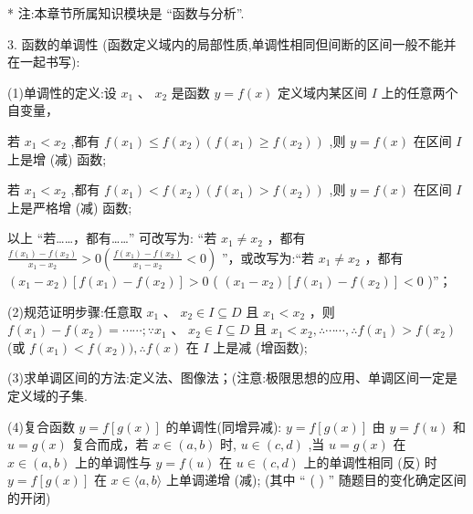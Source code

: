 * 注:本章节所属知识模块是 “函数与分析”.

\HRule

3. 函数的单调性 (函数定义域内的局部性质,单调性相同但间断的区间一般不能并在一起书写):

(1)单调性的定义:设 ${x}_{1}$ 、 ${x}_{2}$ 是函数 $y = f\left( x\right)$ 定义域内某区间 $I$ 上的任意两个自变量，

若 ${x}_{1} < {x}_{2}$ ,都有 $f\left( {x}_{1}\right)  \leq  f\left( {x}_{2}\right) \left( {f\left( {x}_{1}\right)  \geq  f\left( {x}_{2}\right) }\right)$ ,则 $y = f\left( x\right)$ 在区间 $I$ 上是增 (减) 函数;

若 ${x}_{1} < {x}_{2}$ ,都有 $f\left( {x}_{1}\right)  < f\left( {x}_{2}\right) \left( {f\left( {x}_{1}\right)  > f\left( {x}_{2}\right) }\right)$ ,则 $y = f\left( x\right)$ 在区间 $I$ 上是严格增 (减) 函数;

以上 “若……，都有……” 可改写为: “若 ${x}_{1} \neq  {x}_{2}$ ，都有 $\frac{f\left( {x}_{1}\right)  - f\left( {x}_{2}\right) }{{x}_{1} - {x}_{2}} > 0\left( {\frac{f\left( {x}_{1}\right)  - f\left( {x}_{2}\right) }{{x}_{1} - {x}_{2}} < 0}\right)$ ”，或改写为:“若 ${x}_{1} \neq  {x}_{2}$ ，都有 $\left( {{x}_{1} - {x}_{2}}\right) \left\lbrack  {f\left( {x}_{1}\right)  - f\left( {x}_{2}\right) }\right\rbrack   > 0$ ( $\left( {{x}_{1} - {x}_{2}}\right) \left\lbrack  {f\left( {x}_{1}\right)  - f\left( {x}_{2}\right) }\right\rbrack   < 0$ )”；

(2)规范证明步骤:任意取 ${x}_{1}\text{ 、 }{x}_{2} \in  I \subseteq  D$ 且 ${x}_{1} < {x}_{2}$ ，则 $f\left( {x}_{1}\right)  - f\left( {x}_{2}\right)  = \cdots \cdots ;\because {x}_{1}\text{ 、 }{x}_{2} \in  I \subseteq  D$ 且 ${x}_{1} < {x}_{2},\therefore \cdots \cdots ,\therefore f\left( {x}_{1}\right)  > f\left( {x}_{2}\right)$ (或 $f\left( {x}_{1}\right)  < f\left( {x}_{2}\right) ),\therefore f\left( x\right)$ 在 $I$ 上是减 (增函数);

(3)求单调区间的方法:定义法、图像法；(注意:极限思想的应用、单调区间一定是定义域的子集.

(4)复合函数 $y = f\left\lbrack  {g\left( x\right) }\right\rbrack$ 的单调性(同增异减): $y = f\left\lbrack  {g\left( x\right) }\right\rbrack$ 由 $y = f\left( u\right)$ 和 $u = g\left( x\right)$ 复合而成，若 $x \in  \left( {a,b}\right)$ 时, $u \in  \left( {c,d}\right)$ ,当 $u = g\left( x\right)$ 在 $x \in  \left( {a,b}\right)$ 上的单调性与 $y = f\left( u\right)$ 在 $u \in  \left( {c,d}\right)$ 上的单调性相同 (反) 时 $y = f\left\lbrack  {g\left( x\right) }\right\rbrack$ 在 $x \in  \langle a,b\rangle$ 上单调递增 (减); (其中 “ ( ) ” 随题目的变化确定区间的开闭)

